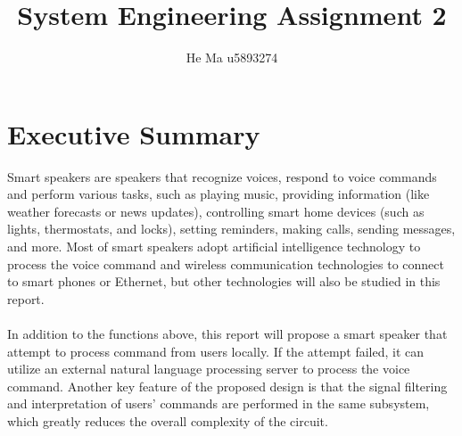 \documentclass{article}
\date{}
\author{He Ma u5893274}
\begin{document}
\title{\vspace{-1cm}System Engineering Assignment 2}
\maketitle
\section{Executive Summary}
Smart speakers are speakers that recognize voices, respond to voice commands and perform various tasks, such as playing music, providing information (like weather forecasts or news updates), controlling smart home devices (such as lights, thermostats, and locks), setting reminders, making calls, sending messages, and more. Most of smart speakers adopt artificial intelligence technology to process the voice command and wireless communication technologies to connect to smart phones or Ethernet, but other technologies will also be studied in this report.\\\\
In addition to the functions above, this report will propose a smart speaker that attempt to process command from users locally. If the attempt failed, it can utilize an external natural language processing server to process the voice command. Another key feature of the proposed design is that the signal filtering and interpretation of users' commands are performed in the same subsystem, which greatly reduces the overall complexity of the circuit.\\\\
\end{document}

